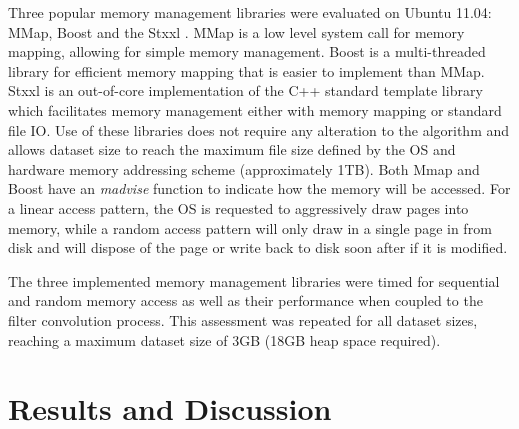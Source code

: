 Three popular memory management libraries were evaluated on Ubuntu 11.04: MMap, Boost \citep{Gaz2012} and the Stxxl \citep{Dementiev2005}.
MMap is a low level system call for memory mapping, allowing for simple memory management.
Boost is a multi-threaded library for efficient memory mapping that is easier to implement than MMap.
 Stxxl is an out-of-core implementation of the C++ standard template library which facilitates memory management either with memory mapping or standard file IO.
Use of these libraries does not require any alteration to the algorithm  and allows dataset size to reach
the maximum file size defined by the OS and hardware memory addressing scheme (approximately 1TB).
Both Mmap and Boost have an \emph{madvise}  function to indicate how the memory will be accessed.
For a linear access pattern, the OS is requested to aggressively draw pages into memory, while  a random access pattern will only draw in a single page in from disk and will dispose of the page or write back to disk soon after if it is modified.

The three implemented memory management libraries were timed for sequential and random memory access as well as their performance when coupled to the filter convolution process.  This assessment  was repeated for all dataset sizes, reaching a maximum dataset size of 3GB (18GB heap space required). 


\section{Results and Discussion}
  
